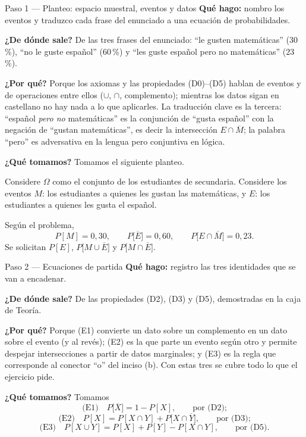 \documentclass[11pt]{article}
\begin{document}
\begin{sol}

\begin{paso}{Paso 1 --- Planteo: espacio muestral, eventos y datos}
\textbf{Qué hago:} nombro los eventos y traduzco cada frase del enunciado a una ecuación de
probabilidades.

\textbf{¿De dónde sale?} De las tres frases del enunciado: ``le gusten matemáticas'' ($30$\,\%),
``no le guste español'' ($60$\,\%) y ``les guste español pero no matemáticas'' ($23$\,\%).

\textbf{¿Por qué?} Porque los axiomas y las propiedades (D0)--(D5) hablan de eventos y de
operaciones entre ellos ($\cup$, $\cap$, complemento); mientras los datos sigan en castellano no
hay nada a lo que aplicarles. La traducción clave es la tercera: ``español \emph{pero no}
matemáticas'' es la conjunción de ``gusta español'' con la negación de ``gustan matemáticas'',
es decir la intersección $E\cap\overline{M}$; la palabra ``pero'' es adversativa en la lengua
pero conjuntiva en lógica.

\textbf{¿Qué tomamos?} Tomamos el siguiente planteo.

\medskip
Considere $\Omega$ como el conjunto de los estudiantes de secundaria. Considere los eventos
$M$: los estudiantes a quienes les gustan las matemáticas, y $E$: los estudiantes a quienes les
gusta el español.

Según el problema,
\[
P[M]=0{,}30,\qquad P\big[\overline{E}\big]=0{,}60,\qquad P\big[E\cap\overline{M}\big]=0{,}23 .
\]
Se solicitan $P[E]$, $P\big[M\cup\overline{E}\big]$ y $P\big[M\cap\overline{E}\big]$.
\end{paso}

\begin{paso}{Paso 2 --- Ecuaciones de partida}
\textbf{Qué hago:} registro las tres identidades que se van a encadenar.

\textbf{¿De dónde sale?} De las propiedades (D2), (D3) y (D5), demostradas en la caja de Teoría.

\textbf{¿Por qué?} Porque (E1) convierte un dato sobre un complemento en un dato sobre el evento
(y al revés); (E2) es la que parte un evento según otro y permite despejar intersecciones a
partir de datos marginales; y (E3) es la regla que corresponde al conector ``o'' del inciso (b).
Con estas tres se cubre todo lo que el ejercicio pide.

\textbf{¿Qué tomamos?} Tomamos
\[
\text{(E1)}\quad P\big[\overline{X}\big]=1-P[X],\qquad\text{por (D2);}
\]
\[
\text{(E2)}\quad P[X]=P[X\cap Y]+P\big[X\cap\overline{Y}\big],\qquad\text{por (D3);}
\]
\[
\text{(E3)}\quad P[X\cup Y]=P[X]+P[Y]-P[X\cap Y],\qquad\text{por (D5).}
\]
\end{paso}


\end{sol}
\end{document}
